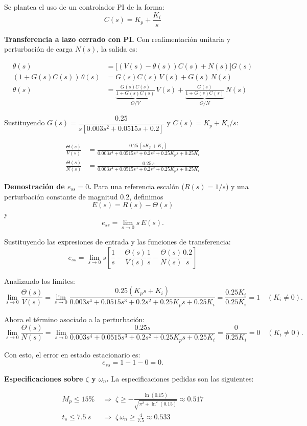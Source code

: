 \documentclass[12pt,a4paper]{article}
\begin{document}
Se plantea el uso de un controlador PI de la forma:
\[
  C(s) = K_p + \frac{K_i}{s}
\]

\textbf{Transferencia a lazo cerrado con PI.}
Con realimentación unitaria y perturbación de carga $N(s)$, la salida es:

\begin{align*}
  \theta(s) &= \bigl[(V(s)-\theta(s))C(s) + N(s)\bigr]G(s) \\
  (1 + G(s)C(s))\,\theta(s) &= G(s)C(s)\,V(s) + G(s)\,N(s) \\[4pt]
  \theta(s) &= \underbrace{\frac{G(s)C(s)}{1+G(s)C(s)}}_{\Theta/V}\,V(s)
             + \underbrace{\frac{G(s)}{1+G(s)C(s)}}_{\Theta/N}\,N(s)
\end{align*}

Sustituyendo $G(s) = \dfrac{0.25}{s[0.003s^2+0.0515s+0.2]}$ y $C(s) = K_p + K_i/s$:

\begin{align}
  \frac{\Theta(s)}{V(s)} &= \frac{0.25(sK_p + K_i)}{0.003s^4 + 0.0515s^3 + 0.2s^2 + 0.25K_p s + 0.25K_i} \label{eq:TvPI}\\[4pt]
  \frac{\Theta(s)}{N(s)} &= \frac{0.25\,s}{0.003s^4 + 0.0515s^3 + 0.2s^2 + 0.25K_p s + 0.25K_i} \label{eq:TnPI}
\end{align}

\textbf{Demostración de $e_{ss}=0$.} Para una referencia escalón (\(R(s)=1/s\)) y una perturbación constante de magnitud $0.2$, definimos
\[
  E(s)=R(s)-\Theta(s)
\]
y
\[
  e_{ss}=\lim_{s\to 0} s\,E(s).
\]

Sustituyendo las expresiones de entrada y las funciones de transferencia:
\[
  e_{ss}=\lim_{s\to 0} s\left[\frac{1}{s} - \frac{\Theta(s)}{V(s)}\frac{1}{s} - \frac{\Theta(s)}{N(s)}\frac{0.2}{s}\right]
\]

Analizando los límites:
\[
  \lim_{s\to 0}\frac{\Theta(s)}{V(s)}
  = \lim_{s\to 0}\frac{0.25(K_ps + K_i)}{0.003s^4 + 0.0515s^3 + 0.2s^2 + 0.25K_p s + 0.25K_i} =\frac{0.25K_i}{0.25K_i}=1 \quad (K_i\neq 0).
\]

Ahora el término asociado a la perturbación:
\[
  \lim_{s\to 0}\frac{\Theta(s)}{N(s)}=\lim_{s\to 0}\frac{0.25s}{0.003s^4 + 0.0515s^3 + 0.2s^2 + 0.25K_p s + 0.25K_i}
  =\frac{0}{0.25K_i}=0 \quad (K_i\neq 0).
\]

Con esto, el error en estado estacionario es:
\[
  e_{ss}=1-1-0=0.
\]


\textbf{Especificaciones sobre $\zeta$ y $\omega_n$.}
La especificaciones pedidas son las siguientes:

\begin{align*}
  M_p \leq 15\%   &\;\Rightarrow\; \zeta \geq -\frac{\ln(0.15)}{\sqrt{\pi^2+\ln^2(0.15)}} \approx 0.517 \\[4pt]
  t_s \leq 7.5\ \si{s} &\;\Rightarrow\; \zeta\,\omega_n \geq \frac{4}{7.5} \approx 0.533
\end{align*}
\end{document}
